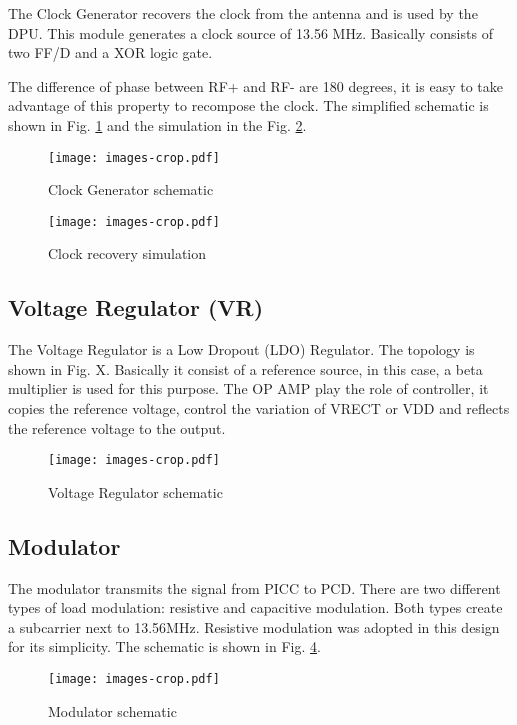 \documentclass[conference]{../../resources/IEEEtran/IEEEtran}
\begin{document}
The Clock Generator recovers the clock from the antenna and is used by the DPU. This module generates a clock source of 13.56 MHz. Basically consists of two FF/D and a XOR logic gate. 

The difference of phase between RF+ and RF- are 180 degrees, it is easy to take advantage of this property to recompose the clock. The simplified schematic is shown in Fig. \ref{fig:clk} and the simulation in the Fig. \ref{fig:clk_sim}.

\begin{figure}[]
  \centering
  \texttt{[image: images-crop.pdf]}
  \caption{Clock Generator schematic}
  \label{fig:clk}
\end{figure}

\begin{figure}[]
  \centering
  \texttt{[image: images-crop.pdf]}
  \caption{Clock recovery simulation}
  \label{fig:clk_sim}
\end{figure}

\subsection{Voltage Regulator (VR)}

The Voltage Regulator is a Low Dropout (LDO) Regulator. The topology is shown in Fig. X. Basically it consist of a reference source, in this case, a beta multiplier is used for this purpose. The OP AMP play the role of controller, it copies the reference voltage, control the variation of VRECT or VDD and reflects the reference voltage to the output.

\begin{figure}[]
  \centering
  \texttt{[image: images-crop.pdf]}
  \caption{Voltage Regulator schematic}
  \label{fig:ldo}
\end{figure}

\subsection{Modulator}

The modulator transmits the signal from PICC to PCD. There are two different types of load modulation: resistive and capacitive modulation. Both types create a subcarrier next to 13.56MHz. Resistive modulation was adopted in this design for its simplicity. The schematic is shown in Fig. \ref{fig:mod}.

\begin{figure}[h]
  \centering
  \texttt{[image: images-crop.pdf]}
  \caption{Modulator schematic}
  \label{fig:mod}
\end{figure}
\end{document}
